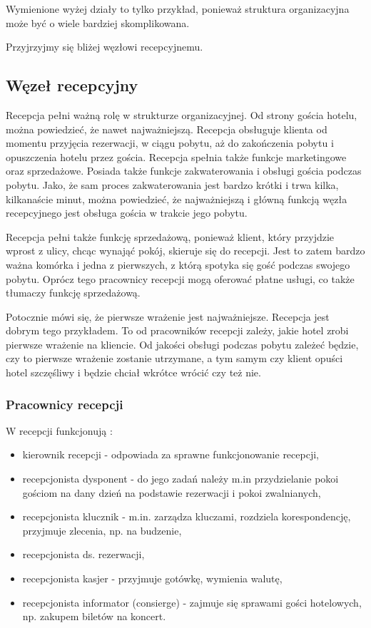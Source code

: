 \documentclass[a4paper,onecolumn,oneside,11pt,wide,floatssmall]{mwrep}
\theoremstyle{definition}
\theoremstyle{plain}%
\theoremstyle{remark}
\begin{document}
Wymienione wyżej działy to tylko przykład, ponieważ struktura 
organizacyjna może być o wiele bardziej skomplikowana.

Przyjrzyjmy się bliżej węzłowi recepcyjnemu.

\subsection{Węzeł recepcyjny}
Recepcja pełni ważną rolę w strukturze organizacyjnej. Od strony gościa hotelu, 
można powiedzieć, że nawet najważniejszą. 
Recepcja obsługuje klienta od momentu przyjęcia rezerwacji, w ciągu pobytu, 
aż do zakończenia pobytu i opuszczenia hotelu przez gościa. Recepcja spełnia 
także funkcje marketingowe 
oraz sprzedażowe. Posiada także funkcje zakwaterowania i obsługi gościa 
podczas pobytu. Jako, że sam proces zakwaterowania jest bardzo krótki i trwa 
kilka, kilkanaście minut, można powiedzieć, że najważniejszą i główną funkcją 
węzła recepcyjnego jest obsługa gościa w trakcie jego pobytu.

Recepcja pełni także funkcję sprzedażową, ponieważ klient, 
który przyjdzie wprost z ulicy, chcąc wynająć pokój, skieruje się do recepcji. 
Jest to zatem  bardzo ważna komórka i jedna z pierwszych, z którą spotyka 
się gość podczas swojego pobytu. Oprócz tego pracownicy recepcji mogą 
oferować płatne usługi, co także tłumaczy funkcję sprzedażową.

Potocznie mówi się, że pierwsze wrażenie jest najważniejsze. Recepcja jest 
dobrym tego przykładem. To od pracowników recepcji zależy, jakie hotel zrobi 
pierwsze wrażenie na kliencie. Od jakości obsługi podczas pobytu zależeć 
będzie, czy to pierwsze wrażenie zostanie utrzymane, a tym samym 
czy klient opuści hotel szczęśliwy i będzie chciał wkrótce wrócić czy też
 nie.


\subsubsection{Pracownicy recepcji}
W recepcji funkcjonują \cite{OrgaDzialHot}:

\begin{itemize}
  \item kierownik recepcji - odpowiada za sprawne 
  funkcjonowanie recepcji,
  \item recepcjonista dysponent - do jego zadań należy m.in przydzielanie 
  pokoi gościom na dany dzień na podstawie rezerwacji i pokoi zwalnianych,
  \item recepcjonista klucznik - m.in. zarządza kluczami, rozdziela 
  korespondencję, przyjmuje zlecenia, np. na budzenie,
  \item recepcjonista ds. rezerwacji,
  \item recepcjonista kasjer - przyjmuje gotówkę, wymienia walutę,
  \item recepcjonista informator (consierge) - zajmuje się sprawami gości 
  hotelowych, np. zakupem biletów na koncert.
\end{itemize}
\end{document}
